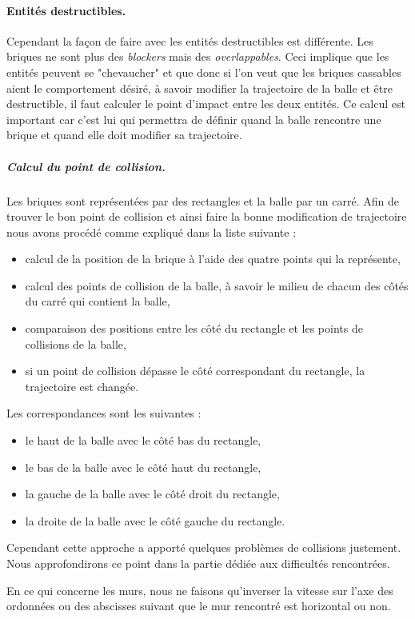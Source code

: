 \documentclass[a4paper,10pt]{article}
\begin{document}
        \paragraph{Entités destructibles.}
		Cependant la façon de faire avec les entités destructibles est différente. Les briques ne sont plus des \textit{blockers}
		mais des \textit{overlappables}. Ceci implique que les entités peuvent se "chevaucher" et que donc si l'on veut que les
		briques cassables aient le comportement désiré, à savoir modifier la trajectoire de la balle et être destructible, il faut
		calculer le point d'impact entre les deux entités. Ce calcul est important car c'est lui qui permettra de définir
		quand la balle rencontre une brique et quand elle doit modifier sa trajectoire.

		\subparagraph{Calcul du point de collision.}
		Les briques sont représentées par des rectangles et la balle par un carré.
		Afin de trouver le bon point de collision et ainsi faire la bonne modification de trajectoire nous avons procédé comme expliqué dans la liste 
		suivante : 
		\begin{itemize}
		\item calcul de la position de la brique à l'aide des quatre points qui la représente,
		\item calcul des points de collision de la balle, à savoir le milieu de chacun des côtés du carré qui contient la balle,
		\item comparaison des positions entre les côté du rectangle et les points de collisions de la balle,
		\item si un point de collision dépasse le côté correspondant du rectangle, la trajectoire est changée.
		\end{itemize}
		Les correspondances sont les suivantes : 
		\begin{itemize}
		\item le haut de la balle avec le côté bas du rectangle,
		\item le bas de la balle avec le côté haut du rectangle,
		\item la gauche de la balle avec le côté droit du rectangle,
		\item la droite de la balle avec le côté gauche du rectangle.
		\end{itemize}
		Cependant cette approche a apporté quelques problèmes de collisions justement. Nous approfondirons ce point
		dans la partie dédiée aux difficultés rencontrées.

        En ce qui concerne les murs, nous ne faisons qu'inverser la vitesse sur l'axe des ordonnées ou des abscisses suivant
        que le mur rencontré est horizontal ou non.
\end{document}
